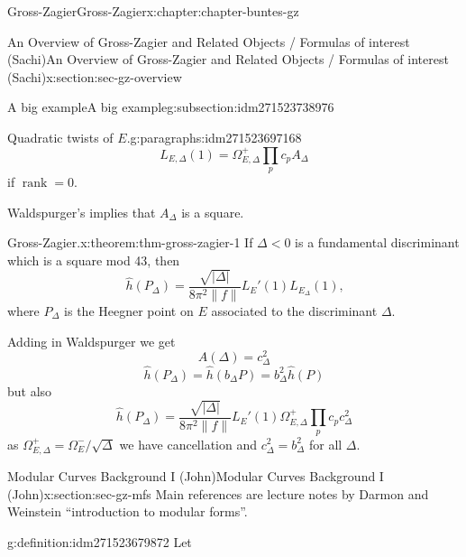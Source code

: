 \documentclass[oneside,10pt,]{book}
\numberwithin{equation}{section}
\DeclareMathOperator{\rank}{rank}
\newcommand{\lt}{<}
\begin{document}
\begin{chapterptx}{Gross-Zagier}{}{Gross-Zagier}{}{}{x:chapter:chapter-buntes-gz}
\begin{sectionptx}{An Overview of Gross-Zagier and Related Objects \slash{} Formulas of interest (Sachi)}{}{An Overview of Gross-Zagier and Related Objects \slash{} Formulas of interest (Sachi)}{}{}{x:section:sec-gz-overview}
\begin{subsectionptx}{A big example}{}{A big example}{}{}{g:subsection:idm271523738976}
\begin{paragraphs}{Quadratic twists of \(E\).}{g:paragraphs:idm271523697168}
\begin{equation*}
L_{E,\Delta } (1) = \Omega _{E,\Delta }^+  \prod_p c_p A_\Delta
\end{equation*}
if \(\rank = 0\).%
\par
Waldspurger's implies that \(A_\Delta \) is a square.%
\end{paragraphs}%
\begin{theorem}{Gross-Zagier.}{}{x:theorem:thm-gross-zagier-1}%
If \(\Delta \lt  0 \) is a fundamental discriminant which is a square mod 43, then%
\begin{equation*}
\hat h(P_\Delta ) = \frac{\sqrt{|\Delta |}}{8\pi ^2 \| f\|} L_E'(1) L_{E_\Delta }(1)\text{,}
\end{equation*}
where \(P_\Delta \) is the Heegner point on \(E\) associated to the discriminant \(\Delta \).%
\end{theorem}
Adding in Waldspurger we get%
\begin{equation*}
A(\Delta ) = c_\Delta ^2
\end{equation*}
%
\begin{equation*}
\hat h(P_\Delta )= \hat h(b_\Delta  P) = b_\Delta ^2\hat h(P)
\end{equation*}
but also%
\begin{equation*}
\hat h(P_\Delta ) = \frac{\sqrt{|\Delta |}}{8\pi ^2 \| f\|} L_E'(1) \Omega _{E,\Delta }^+ \prod_p c_p c_\Delta^2
\end{equation*}
as \(\Omega _{E,\Delta }^+ = \Omega _E^-  / \sqrt \Delta \) we have cancellation and \(c_\Delta ^2 = b_\Delta ^2\) for all \(\Delta \).%
\end{subsectionptx}
\end{sectionptx}
%
%
\typeout{************************************************}
\typeout{************************************************}
%
\begin{sectionptx}{Modular Curves Background I (John)}{}{Modular Curves Background I (John)}{}{}{x:section:sec-gz-mfs}
Main references are lecture notes by Darmon and Weinstein ``introduction to modular forms''.%
\begin{definition}{}{g:definition:idm271523679872}%
Let%
\begin{equation*}

\end{equation*}
\end{definition}
\end{sectionptx}
\end{chapterptx}
\end{document}
